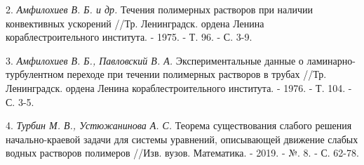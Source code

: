 2. {\it Амфилохиев В. Б. и др.} Течения полимерных растворов при наличии конвективных ускорений //Тр. Ленинградск. ордена Ленина кораблестроительного института. - 1975. - Т. 96. - С. 3-9.

3. {\it Амфилохиев В. Б., Павловский В. А.} Экспериментальные данные о ламинарно-турбулентном переходе при течении полимерных растворов в трубах //Тр. Ленинградск. ордена Ленина кораблестроительного института. - 1976. - Т. 104. - С. 3-5.

4. {\it Турбин М. В., Устюжанинова А. С.} Теорема существования слабого решения начально-краевой задачи для системы уравнений, описывающей движение слабых водных растворов полимеров //Изв. вузов. Математика. - 2019. - №. 8. - С. 62-78.
